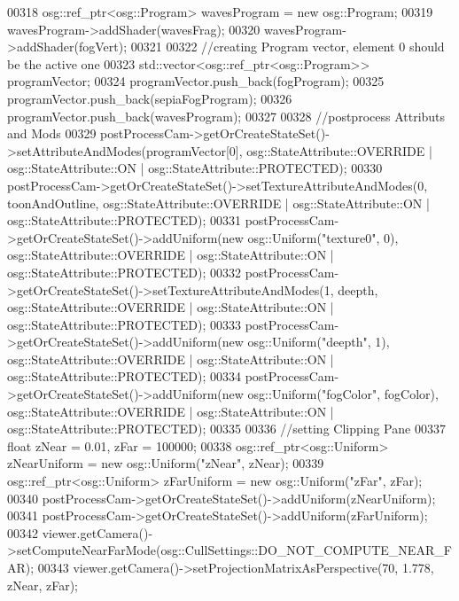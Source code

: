 \begin{DoxyCode}
00318         osg::ref\_ptr<osg::Program> wavesProgram = \textcolor{keyword}{new} osg::Program;
00319         wavesProgram->addShader(wavesFrag);
00320         wavesProgram->addShader(fogVert);
00321 
00322         \textcolor{comment}{//creating Program vector, element 0 should be the active one}
00323         std::vector<osg::ref\_ptr<osg::Program>> programVector;
00324         programVector.push\_back(fogProgram);
00325         programVector.push\_back(sepiaFogProgram);
00326         programVector.push\_back(wavesProgram);
00327 
00328         \textcolor{comment}{//postprocess Attributs and Mods}
00329         postProcessCam->getOrCreateStateSet()->setAttributeAndModes(programVector[0], 
      osg::StateAttribute::OVERRIDE | osg::StateAttribute::ON | osg::StateAttribute::PROTECTED);
00330         postProcessCam->getOrCreateStateSet()->setTextureAttributeAndModes(0, toonAndOutline, 
      osg::StateAttribute::OVERRIDE | osg::StateAttribute::ON | osg::StateAttribute::PROTECTED);
00331         postProcessCam->getOrCreateStateSet()->addUniform(\textcolor{keyword}{new} osg::Uniform(\textcolor{stringliteral}{"texture0"}, 0), 
      osg::StateAttribute::OVERRIDE | osg::StateAttribute::ON | osg::StateAttribute::PROTECTED);
00332         postProcessCam->getOrCreateStateSet()->setTextureAttributeAndModes(1, deepth, 
      osg::StateAttribute::OVERRIDE | osg::StateAttribute::ON | osg::StateAttribute::PROTECTED);
00333         postProcessCam->getOrCreateStateSet()->addUniform(\textcolor{keyword}{new} osg::Uniform(\textcolor{stringliteral}{"deepth"}, 1), 
      osg::StateAttribute::OVERRIDE | osg::StateAttribute::ON | osg::StateAttribute::PROTECTED);
00334         postProcessCam->getOrCreateStateSet()->addUniform(\textcolor{keyword}{new} osg::Uniform(\textcolor{stringliteral}{"fogColor"}, fogColor), 
      osg::StateAttribute::OVERRIDE | osg::StateAttribute::ON | osg::StateAttribute::PROTECTED);
00335 
00336         \textcolor{comment}{//setting Clipping Pane}
00337         \textcolor{keywordtype}{float} zNear = 0.01, zFar = 100000;
00338         osg::ref\_ptr<osg::Uniform> zNearUniform = \textcolor{keyword}{new} osg::Uniform(\textcolor{stringliteral}{"zNear"}, zNear);
00339         osg::ref\_ptr<osg::Uniform> zFarUniform = \textcolor{keyword}{new} osg::Uniform(\textcolor{stringliteral}{"zFar"}, zFar);
00340         postProcessCam->getOrCreateStateSet()->addUniform(zNearUniform);
00341         postProcessCam->getOrCreateStateSet()->addUniform(zFarUniform);
00342         viewer.getCamera()->setComputeNearFarMode(osg::CullSettings::DO\_NOT\_COMPUTE\_NEAR\_FAR);
00343         viewer.getCamera()->setProjectionMatrixAsPerspective(70, 1.778, zNear, zFar);

\end{DoxyCode}
